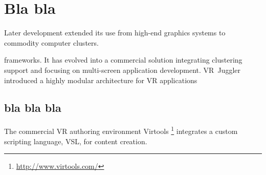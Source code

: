 \documentclass[capstoc,capschap,draftcls]{rpisudiss}
\begin{document}
\section{Bla bla}
Later development
extended its use from high-end graphics systems to commodity computer
clusters.

frameworks. It has evolved into a commercial solution integrating
clustering support and focusing on multi-screen application development.
VR~Juggler introduced a highly modular architecture for VR applications

\subsection{bla bla bla}
The commercial
VR authoring environment Virtools%
\footnote{\url{http://www.virtools.com/}%
} integrates a custom scripting language, VSL, for content creation.
\end{document}
